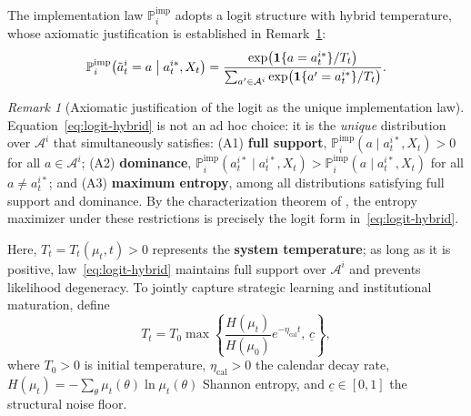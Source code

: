 \documentclass[12pt,a4paper]{article}
\providecommand{\textcite}{\citet}
\theoremstyle{plain}
\theoremstyle{definition}
\theoremstyle{remark}
\newtheorem{remark}[theorem]{Remark}
\newcommand{\ProbI}[1]{\mathbb{P}_{#1}^{\mathrm{imp}}}
\newcommand{\1}{\mathbf{1}}
\begin{document}
The implementation law $\ProbI{i}$ adopts a logit structure with hybrid temperature,
whose axiomatic justification is established in Remark~\ref{rem:axiomas-logit}:
\begin{equation}
\label{eq:logit-hybrid}
\ProbI{i}\bigl(\tilde{a}_t^i = a \bigm| a_t^{i\ast}, X_t\bigr)
=
\frac{\exp\bigl(\mathbf{1}\{a = a_t^{i\ast}\}/T_t\bigr)}
{\sum_{a'\in\mathcal A^i}\exp\bigl(\mathbf{1}\{a'=a_t^{i\ast}\}/T_t\bigr)}.
\end{equation}

\begin{remark}[Axiomatic justification of the logit as the unique implementation law]
\label{rem:axiomas-logit}
Equation~\eqref{eq:logit-hybrid} is not an ad hoc choice: it is the \emph{unique}
distribution over $\mathcal A^i$ that simultaneously satisfies: \textup{(A1)}
\textbf{full support}, $\ProbI{i}(a\mid a_t^{i\ast},X_t)>0$ for all
$a\in\mathcal A^i$; \textup{(A2)} \textbf{dominance},
$\ProbI{i}(a_t^{i\ast}\mid a_t^{i\ast},X_t)>
\ProbI{i}(a\mid a_t^{i\ast},X_t)$ for all $a\neq a_t^{i\ast}$; and \textup{(A3)}
\textbf{maximum entropy}, among all distributions satisfying full support and
dominance. By the characterization theorem of
\textcite{Jaynes1957Information,Jaynes1957InformationII}, the entropy maximizer under
these restrictions is precisely the logit form in~\eqref{eq:logit-hybrid}.
\end{remark}

Here, $T_t=T_t(\mu_t,t)>0$ represents the \textbf{system temperature}; as long as it is
positive, law~\eqref{eq:logit-hybrid} maintains full support over $\mathcal A^i$ and
prevents likelihood degeneracy. To jointly capture strategic learning and institutional
maturation, define
\begin{equation}
\label{eq:temperatura-piso}
T_t=T_0\max\!\left\{\frac{H(\mu_t)}{H(\mu_0)}e^{-\eta_{\mathrm{cal}}t},\,\underline c\right\},
\end{equation}
where $T_0>0$ is initial temperature, $\eta_{\mathrm{cal}}>0$ the calendar decay rate,
$H(\mu_t)=-\sum_{\theta}\mu_t(\theta)\ln\mu_t(\theta)$ Shannon entropy, and
$\underline c\in[0,1]$ the structural noise floor.
\end{document}
